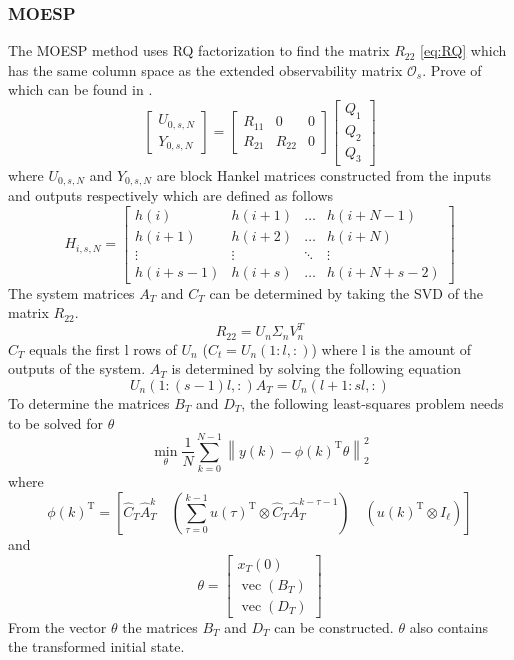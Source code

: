 \subsubsection{MOESP}
The MOESP method uses RQ factorization to find the matrix $R_{22}$ \ref{eq:RQ} which has the same column space as the extended observability matrix $\mathcal{O}_s$. Prove of which can be found in \cite[p.~304--305]{FilteringIdentification}.
\begin{equation}
    \left[\begin{array}{c}
        U_{0, s, N} \\
        Y_{0, s, N}
    \end{array}\right]=\left[\begin{array}{ccc}
        R_{11} & 0 & 0 \\
        R_{21} & R_{22} & 0
    \end{array}\right]\left[\begin{array}{c}
        Q_{1} \\
        Q_{2} \\
        Q_{3}
    \end{array}\right]
    \label{eq:RQ}
\end{equation}
where $U_{0,s,N}$ and $Y_{0,s,N}$ are block Hankel matrices constructed from the inputs and outputs respectively which are defined as follows
$$
H_{i, s, N}=\left[\begin{array}{cccc}
h(i) & h(i+1) & \dots & h(i+N-1) \\
h(i+1) & h(i+2) & \dots & h(i+N) \\
\vdots & \vdots & \ddots & \vdots \\
h(i+s-1) & h(i+s) & \dots & h(i+N+s-2)
\end{array}\right]
$$
The system matrices $A_T$ and $C_T$ can be determined by taking the SVD of the matrix $R_{22}$.
$$
R_{22} = U_n\Sigma_nV_n^T
$$
$C_T$ equals the first l rows of $U_n$ ($C_t = U_n(1:l,:)$) where l is the amount of outputs of the system.
$A_T$ is determined by solving the following equation
$$
U_n(1:(s-1)l,:)A_T = U_n(l+1:sl,:)
$$
To determine the matrices $B_T$ and $D_T$, the following least-squares problem needs to be solved for $\theta$
$$
    \min _{\theta} \frac{1}{N} \sum_{k=0}^{N-1}\left\|y(k)-\phi(k)^{\mathrm{T}} \theta\right\|_{2}^{2}
$$
where
$$
    \phi(k)^{\mathrm{T}}=\left[\widehat{C}_{T} \widehat{A}_{T}^{k} \quad\left(\sum_{\tau=0}^{k-1} u(\tau)^{\mathrm{T}} \otimes \widehat{C}_{T} \widehat{A}_{T}^{k-\tau-1}\right) \quad\left(u(k)^{\mathrm{T}} \otimes I_{\ell}\right)\right]
$$
and
$$
    \theta=\left[\begin{array}{c}
    x_{T}(0) \\
    \operatorname{vec}\left(B_{T}\right) \\
    \operatorname{vec}\left(D_{T}\right)
    \end{array}\right]
$$
From the vector $\theta$ the matrices $B_T$ and $D_T$ can be constructed. $\theta$ also contains the transformed initial state.

